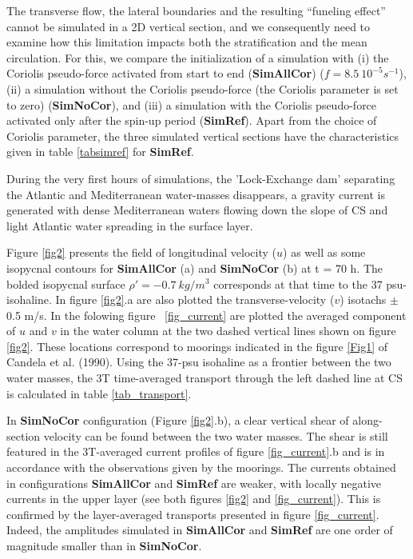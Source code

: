 \documentclass[a4paper,12pt]{article}
\begin{document}
The transverse flow, the lateral boundaries and the resulting ``funeling effect'' cannot be simulated in a 2D vertical section, and we consequently need to examine how this limitation impacts both the stratification and the mean circulation. For this, we compare the initialization of a simulation with (i) the Coriolis pseudo-force activated from start to end (\textbf{SimAllCor}) ($f = 8.5 \ 10^{-5} s^{-1}$), (ii) a simulation without the Coriolis pseudo-force (the Coriolis parameter is set to zero) (\textbf{SimNoCor}), and (iii) a simulation with the Coriolis pseudo-force activated only after the spin-up period (\textbf{SimRef}). Apart from the choice of Coriolis parameter, the three simulated vertical sections have the characteristics given in table \ref{tabsimref} for \textbf{SimRef}. 

During the very first hours of simulations, the 'Lock-Exchange dam' separating the Atlantic and Mediterranean water-masses disappears, a gravity current is generated with dense Mediterranean waters flowing down the slope of CS and light Atlantic water spreading in the surface layer.

Figure \ref{fig2} presents the field of longitudinal velocity ($u$) as well as some isopycnal contours for \textbf{SimAllCor} (a) and \textbf{SimNoCor} (b) at t = 70 h. The bolded isopycnal surface $\rho'= -0.7\ kg/m^3$ corresponds at that time to the 37 psu-isohaline. In figure \ref{fig2}.a are also plotted the transverse-velocity ($v$) isotachs $\pm$ 0.5 m/s. In the folowing figure \ \ref{fig_current} are plotted the averaged component of $u$ and $v$ in the water column at the two dashed vertical lines shown on figure \ref{fig2}. These locations correspond to moorings indicated in the figure \ref{Fig1} of Candela et al. (1990). Using the 37-psu isohaline as a frontier between the two water masses, the 3T time-averaged transport through the left dashed line at CS is calculated in table \ref{tab_transport}.

In \textbf{SimNoCor} configuration (Figure \ref{fig2}.b), a clear vertical shear of along-section velocity can be found between the two water masses. The shear is still featured in the 3T-averaged current profiles of figure \ref{fig_current}.b and is in accordance with the observations given by the moorings. The currents obtained in configurations \textbf{SimAllCor} and \textbf{SimRef} are weaker, with locally negative currents in the upper layer (see both figures \ref{fig2} and \ref{fig_current}). This is confirmed by the layer-averaged transports presented in figure \ref{fig_current}. Indeed, the amplitudes simulated in \textbf{SimAllCor} and \textbf{SimRef} are one order of magnitude smaller than in \textbf{SimNoCor}. 
 
\end{document}
